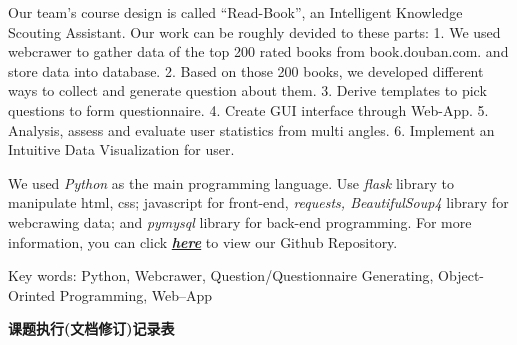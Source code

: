 \documentclass[twoside,11pt]{article}
\begin{document}

Our team's course design is called ``Read-Book'', an Intelligent Knowledge Scouting Assistant. Our work can be roughly devided to these parts:  1. We used webcrawer to gather data of the top 200 rated books from book.douban.com. and store data into database. 2. Based on those 200 books, we developed different ways to collect and generate question about them. 3. Derive templates to pick questions to form questionnaire. 4. Create GUI interface through Web-App. 5. Analysis, assess and evaluate user statistics from multi angles. 6. Implement an Intuitive Data Visualization for user.

We used \emph{Python} as the main programming language. Use \emph{flask} library to manipulate html, css; javascript for front-end, \emph{requests, BeautifulSoup4} library for webcrawing data; and \emph{pymysql} library for back-end programming. For more information, you can click  \href{https://github.com/Casta-mere/Read-Book}{\textbf{\emph{here}}} to view our Github Repository. \\ \vspace{1.0cm}

Key words: Python, Webcrawer, Question/Questionnaire Generating, Object-Orinted Programming, Web--App


\newpage


\begin{center}
    \Large\textbf{课题执行(文档修订)记录表}
\end{center}

\begin{table}[H]
    \centering
    \caption{课题执行(文档修订)记录表}

    \label{tab:tab1}
\end{table}
\end{document}
